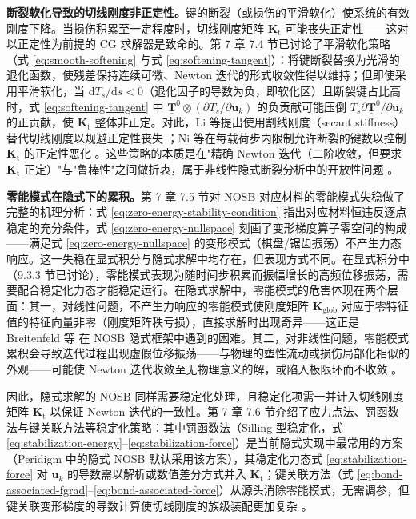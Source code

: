 \textbf{断裂软化导致的切线刚度非正定性。}键的断裂（或损伤的平滑软化）使系统的有效刚度下降。当损伤积累至一定程度时，切线刚度矩阵 $\mathbf{K}_{\mathrm{t}}$ 可能丧失正定性——这对以正定性为前提的 CG 求解器是致命的。第 7 章 7.4 节已讨论了平滑软化策略（式 \eqref{eq:smooth-softening} 与式 \eqref{eq:softening-tangent}）：将键断裂替换为光滑的退化函数，使残差保持连续可微、Newton 迭代的形式收敛性得以维持；但即使采用平滑软化，当 $\mathrm{d}T_s/\mathrm{d}s<0$（退化因子的导数为负，即软化区）且断裂键占比高时，式 \eqref{eq:softening-tangent} 中 $\underline{\mathbf{T}}^{0}\otimes(\partial T_s/\partial\mathbf{u}_k)$ 的负贡献可能压倒 $T_s\partial\underline{\mathbf{T}}^{0}/\partial\mathbf{u}_k$ 的正贡献，使 $\mathbf{K}_{\mathrm{t}}$ 整体非正定。对此，Li 等提出使用割线刚度（secant stiffness）替代切线刚度以规避正定性丧失 \cite{Li2019}；Ni 等在每载荷步内限制允许断裂的键数以控制 $\mathbf{K}_{\mathrm{t}}$ 的正定性恶化 \cite{Ni2019}。这些策略的本质是在"精确 Newton 迭代（二阶收敛，但要求 $\mathbf{K}_{\mathrm{t}}$ 正定）"与"鲁棒性"之间做折衷，属于非线性隐式断裂分析中的开放性问题 \cite{Hashim2020}。

\textbf{零能模式在隐式下的累积。}第 7 章 7.5 节对 NOSB 对应材料的零能模式失稳做了完整的机理分析：式 \eqref{eq:zero-energy-stability-condition} 指出对应材料恒违反逐点稳定的充分条件，式 \eqref{eq:zero-energy-nullspace} 刻画了变形梯度算子零空间的构成——满足式 \eqref{eq:zero-energy-nullspace} 的变形模式（棋盘/锯齿振荡）不产生力态响应。这一失稳在显式积分与隐式求解中均存在，但表现方式不同。在显式积分中（9.3.3 节已讨论），零能模式表现为随时间步积累而振幅增长的高频位移振荡，需要配合稳定化力态才能稳定运行。在隐式求解中，零能模式的危害体现在两个层面：其一，对线性问题，不产生力响应的零能模式使刚度矩阵 $\mathbf{K}_{\mathrm{glob}}$ 对应于零特征值的特征向量非零（刚度矩阵秩亏损），直接求解时出现奇异——这正是 Breitenfeld 等 \cite{Breitenfeld2014} 在 NOSB 隐式框架中遇到的困难。其二，对非线性问题，零能模式累积会导致迭代过程出现虚假位移振荡——与物理的塑性流动或损伤局部化相似的外观——可能使 Newton 迭代收敛至无物理意义的解，或陷入极限环而不收敛 \cite{Silling2017,Hashim2020}。

因此，隐式求解的 NOSB 同样需要稳定化处理，且稳定化项需一并计入切线刚度矩阵 $\mathbf{K}_{\mathrm{t}}$ 以保证 Newton 迭代的一致性。第 7 章 7.6 节介绍了应力点法、罚函数法与键关联方法等稳定化策略：其中罚函数法（Silling 型稳定化，式 \eqref{eq:stabilization-energy}--\eqref{eq:stabilization-force}）是当前隐式实现中最常用的方案（Peridigm 中的隐式 NOSB 默认采用该方案）\cite{Littlewood2015}，其稳定化力态式 \eqref{eq:stabilization-force} 对 $\mathbf{u}_k$ 的导数需以解析或数值差分方式并入 $\mathbf{K}_{\mathrm{t}}$；键关联方法（式 \eqref{eq:bond-associated-fgrad}--\eqref{eq:bond-associated-force}）从源头消除零能模式，无需调参，但键关联变形梯度的导数计算使切线刚度的族级装配更加复杂 \cite{Chen2018}。

